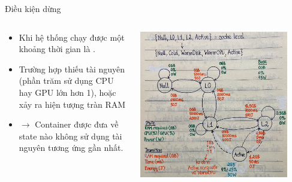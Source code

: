 \documentclass[10pt,aspectratio=169]{beamer}
\begin{document}
\begin{frame}{Điều kiện dừng}{\secname}
\begin{columns}
\begin{column}{0.4\textwidth}
\begin{itemize}
\setlength\itemsep{8pt}
\item Khi hệ thống chạy được một khoảng thời gian là .
\item Trường hợp thiếu tài nguyên (phần trăm sử dụng CPU hay GPU lớn hơn 1), hoặc xảy ra hiện tượng tràn RAM 
\item[] $ \rightarrow $ Container được đưa về state nào không sử dụng tài nguyên tương ứng gần nhất.
\end{itemize}
\end{column}
\begin{column}{0.5\textwidth}
\includegraphics[width=0.88\textwidth]{source/3.png}\\
\end{column}
\end{columns}
\end{frame}
\end{document}
